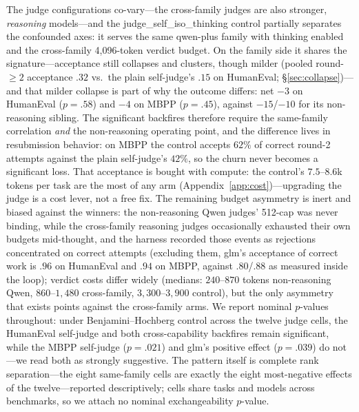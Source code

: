\documentclass[10pt]{article}
\begin{document}
The judge configurations co-vary---the cross-family judges are
also stronger, \emph{reasoning} models---and the
\textsf{judge\_self\_iso\_thinking} control partially separates
the confounded axes:
it serves the same qwen-plus family with thinking enabled and the
cross-family 4{,}096-token verdict budget.  On the family side it
shares the signature---acceptance still collapses and clusters,
though milder (pooled round-$\geq 2$ acceptance $.32$ vs.\ the plain
self-judge's $.15$ on HumanEval; §\ref{sec:collapse})---and that
milder collapse is part of why the outcome differs: net $-3$ on
HumanEval ($p = .58$) and $-4$ on MBPP ($p = .45$), against
$-15$/$-10$ for its non-reasoning sibling.
The significant backfires therefore require the same-family
correlation \emph{and} the non-reasoning operating point, and the
difference lives in resubmission behavior: on MBPP the control
accepts $62\%$ of correct round-2 attempts against the plain
self-judge's $42\%$, so the churn never becomes a significant
loss.  That acceptance is bought with compute: the control's
$7.5$--$8.6$k tokens per task are the most of any arm
(Appendix~\ref{app:cost})---upgrading the judge is a cost lever,
not a free fix.  The remaining budget asymmetry is
inert and biased against the winners: the non-reasoning Qwen
judges' 512-cap was never binding, while the cross-family
reasoning judges occasionally exhausted their own budgets
mid-thought, and the harness recorded those events as rejections
concentrated on correct attempts (excluding them, glm's
acceptance of correct work is $.96$ on HumanEval and $.94$ on
MBPP, against $.80$/$.88$ as measured inside the loop); verdict
costs differ widely (medians: $240$--$870$ tokens non-reasoning
Qwen, $860$--$1{,}480$ cross-family, $3{,}300$--$3{,}900$
control),
but the only asymmetry that exists points against the
cross-family arms.  We report nominal $p$-values throughout: under
Benjamini--Hochberg control across the twelve judge cells, the
HumanEval self-judge and both cross-capability backfires remain
significant, while the MBPP self-judge ($p = .021$) and glm's
positive effect ($p = .039$) do not---we read both as strongly
suggestive.  The pattern itself is complete rank separation---the
eight same-family cells are exactly the eight most-negative
effects of the twelve---reported descriptively; cells share tasks
and models across benchmarks, so we attach no nominal
exchangeability $p$-value.
\end{document}
